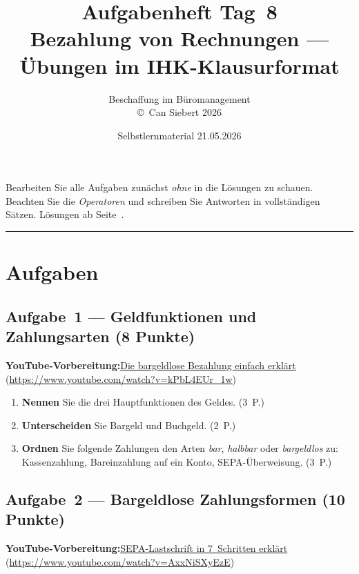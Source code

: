 \documentclass[11pt, a4paper]{article}
\title{\vspace*{-1.5cm}\Huge\bfseries\color{bfwPrimaryDark}Aufgabenheft Tag~8\\[0.4em]
  \large\color{bfwInkSoft}\textnormal{Bezahlung von Rechnungen --- Übungen im IHK-Klausurformat}}
\author{\textsf{Beschaffung im Büromanagement}\\
\textsf{\small\copyright\ Can Siebert\,\textperiodcentered\,2026}}
\date{Selbstlernmaterial \textperiodcentered{} 21.05.2026}
\begin{document}
\maketitle
\thispagestyle{empty}

\begin{merksatz}[title={\bfseries So nutzen Sie dieses Aufgabenheft}]
Bearbeiten Sie alle Aufgaben zunächst \emph{ohne} in die Lösungen zu schauen.
Beachten Sie die \emph{Operatoren} und schreiben Sie Antworten in vollständigen Sätzen.
Lösungen ab Seite~\pageref{loesungen}.
\end{merksatz}

\tableofcontents
\vspace{1em}
\hrule

\section{Aufgaben}

\subsection*{Aufgabe~1 --- Geldfunktionen und Zahlungsarten (8 Punkte)}

\noindent\textbf{\color{bfwAccent}YouTube-Vorbereitung:}\enspace \href{https://www.youtube.com/watch?v=kPbL4EUr_1w}{Die bargeldlose Bezahlung einfach erklärt} (\url{https://www.youtube.com/watch?v=kPbL4EUr_1w})

\medskip
\begin{enumerate}[label=(\alph*)]
  \item \textbf{Nennen} Sie die drei Hauptfunktionen des Geldes. \hfill (3~P.)
  \item \textbf{Unterscheiden} Sie Bargeld und Buchgeld. \hfill (2~P.)
  \item \textbf{Ordnen} Sie folgende Zahlungen den Arten \emph{bar}, \emph{halbbar} oder \emph{bargeldlos} zu: Kassenzahlung, Bareinzahlung auf ein Konto, SEPA-Überweisung. \hfill (3~P.)
\end{enumerate}

\subsection*{Aufgabe~2 --- Bargeldlose Zahlungsformen (10 Punkte)}

\noindent\textbf{\color{bfwAccent}YouTube-Vorbereitung:}\enspace \href{https://www.youtube.com/watch?v=AxxNiSXyEzE}{SEPA-Lastschrift in 7~Schritten erklärt} (\url{https://www.youtube.com/watch?v=AxxNiSXyEzE})
\end{document}
